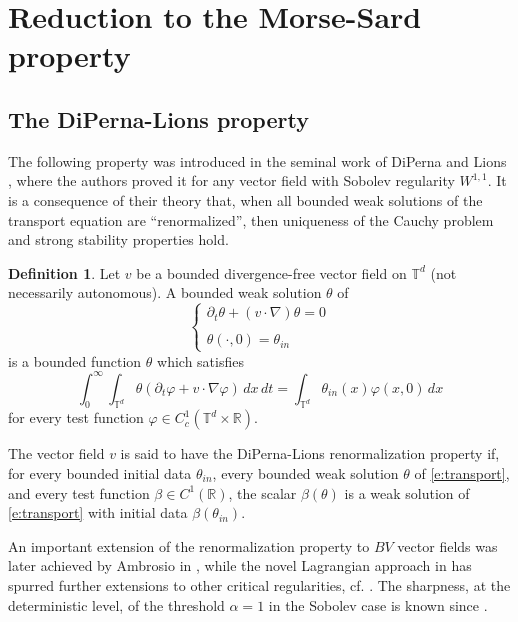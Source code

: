\documentclass[11pt,reqno]{amsart}
\theoremstyle{definition}
\newtheorem{definition}[theorem]{Definition}
\numberwithin{equation}{section}
\begin{document}
\section{Reduction to the Morse-Sard property}\label{s:general}

\subsection{The DiPerna-Lions property} The following property was introduced in the seminal work of DiPerna and Lions \cite{DiPernaLions1989}, where the authors proved it for any vector field with Sobolev regularity $W^{1,1}$. It is a consequence of their theory that, when all bounded weak solutions of the transport equation are ``renormalized'', then uniqueness of the Cauchy problem and strong stability properties hold. 

\begin{definition}\label{d:renormalization}
Let $v$ be a bounded divergence-free vector field on $\mathbb T^d$ (not necessarily autonomous). A bounded weak solution $\theta$ of 
\begin{equation}\label{e:transport}
\left\{
\begin{array}{ll}
\partial_t \theta + (v\cdot \nabla )\theta = 0 \\ \\
\theta (\cdot, 0) = \theta_{in}
\end{array}
\right.
\end{equation}
is a bounded function $\theta$ which satisfies 
\begin{equation}\label{e:distributional}
\int_0^\infty \int_{\mathbb T^d} \theta (\partial_t \varphi + v\cdot \nabla \varphi)\, dx\, dt 
= \int_{\mathbb T^d} \theta_{in} (x) \varphi (x, 0)\, dx 
\end{equation}
for every test function $\varphi \in C^1_c (\mathbb T^d \times \mathbb R)$. 

The vector field $v$ is said to have the DiPerna-Lions renormalization property if, for every bounded initial data $\theta_{in}$, every bounded weak solution $\theta$ of \eqref{e:transport}, and every test function $\beta \in C^1 (\mathbb R)$, the scalar $\beta (\theta)$ is a weak solution of \eqref{e:transport} with initial data $\beta (\theta_{in})$.  
\end{definition}

An important extension of the renormalization property to $BV$ vector fields was later achieved by Ambrosio in \cite{Ambrosio2004}, while the novel Lagrangian approach in \cite{CrippaDeLellis2008} has spurred further extensions to other critical regularities, cf. \cite{BouchutCrippa}. The sharpness, at the deterministic level, of the threshold $\alpha=1$ in the Sobolev case is known since \cite{Depauw}.
\end{document}
